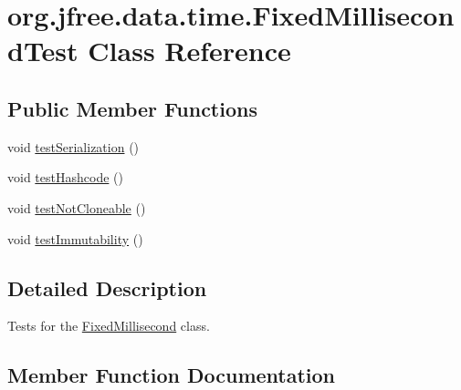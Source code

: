 \hypertarget{classorg_1_1jfree_1_1data_1_1time_1_1_fixed_millisecond_test}{}\section{org.\+jfree.\+data.\+time.\+Fixed\+Millisecond\+Test Class Reference}
\label{classorg_1_1jfree_1_1data_1_1time_1_1_fixed_millisecond_test}
\subsection*{Public Member Functions}
\begin{DoxyCompactItemize}
\item 
void \mbox{\hyperlink{classorg_1_1jfree_1_1data_1_1time_1_1_fixed_millisecond_test_a72ed04b403a98617509718dc7b690065}{test\+Serialization}} ()
\item 
void \mbox{\hyperlink{classorg_1_1jfree_1_1data_1_1time_1_1_fixed_millisecond_test_ac978b209e7613596b00d1f07a105d65e}{test\+Hashcode}} ()
\item 
void \mbox{\hyperlink{classorg_1_1jfree_1_1data_1_1time_1_1_fixed_millisecond_test_adf609610b23ccec7c6e22496ffb81b27}{test\+Not\+Cloneable}} ()
\item 
void \mbox{\hyperlink{classorg_1_1jfree_1_1data_1_1time_1_1_fixed_millisecond_test_ac56d0d61cb21d50b0c6e06e78724e0b2}{test\+Immutability}} ()
\end{DoxyCompactItemize}


\subsection{Detailed Description}
Tests for the \mbox{\hyperlink{classorg_1_1jfree_1_1data_1_1time_1_1_fixed_millisecond}{Fixed\+Millisecond}} class. 

\subsection{Member Function Documentation}
\mbox{\label{classorg_1_1jfree_1_1data_1_1time_1_1_fixed_millisecond_test_ac978b209e7613596b00d1f07a105d65e}} 

